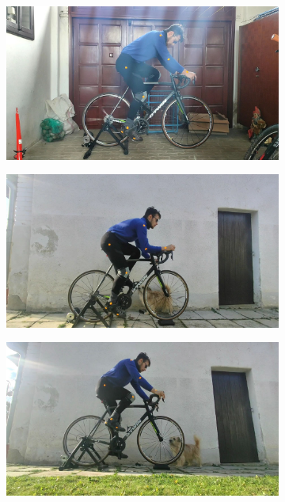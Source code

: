 \begin{figure}[htbp]
    \centering
    \begin{subfigure}[b]{\imgwidth}
        \centering

        \includegraphics[width=1\linewidth]{obrazky-figures/1.jpg}

    \end{subfigure}
    \hfill
    \begin{subfigure}[b]{\imgwidth}
        \centering

        \includegraphics[width=1\linewidth]{obrazky-figures/2.jpg}

    \end{subfigure}
    \hfill
    \begin{subfigure}[b]{\imgwidth}
        \centering

        \includegraphics[width=1\linewidth]{obrazky-figures/3.jpg}
    \end{subfigure}


\end{figure}
